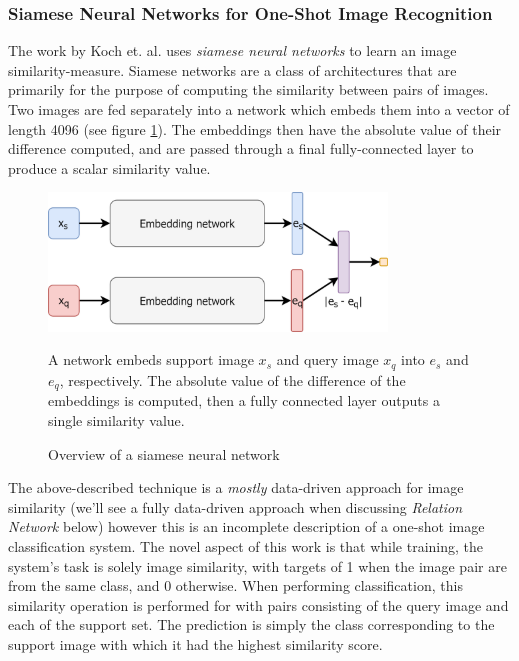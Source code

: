 \documentclass{report}
\begin{document}
	\subsubsection{Siamese Neural Networks for One-Shot Image Recognition}
	The work by Koch et. al. \parencite{siamese} uses \textit{siamese neural networks} to learn an image similarity-measure. Siamese networks are a class of architectures that are primarily for the purpose of computing the similarity between pairs of images. Two images are fed separately into a network which embeds them into a vector of length 4096 (see figure \ref{fig:siamese:2}). The embeddings then have the absolute value of their difference computed, and are passed through a final fully-connected layer to produce a scalar similarity value. \par
	\begin{figure}[h]
		\centering
		\includegraphics[width=9cm]{siamese}
		\caption{Overview of a siamese neural network}
		A network embeds support image $x_s$ and query image $x_q$ into $e_s$ and $e_q$, respectively. The absolute value of the difference of the embeddings is computed, then a fully connected layer outputs a single similarity value.
		\label{fig:siamese:2}
	\end{figure}
	The above-described technique is a \emph{mostly} data-driven approach for image similarity (we'll see a fully data-driven approach when discussing \textit{Relation Network} below) however this is an incomplete description of a one-shot image classification system. The novel aspect of this work is that while training, the system's task is solely image similarity, with targets of 1 when the image pair are from the same class, and 0 otherwise. When performing classification, this similarity operation is performed for with pairs consisting of the query image and each of the support set. The prediction is simply the class corresponding to the support image with which it had the highest similarity score. \par
\end{document}
